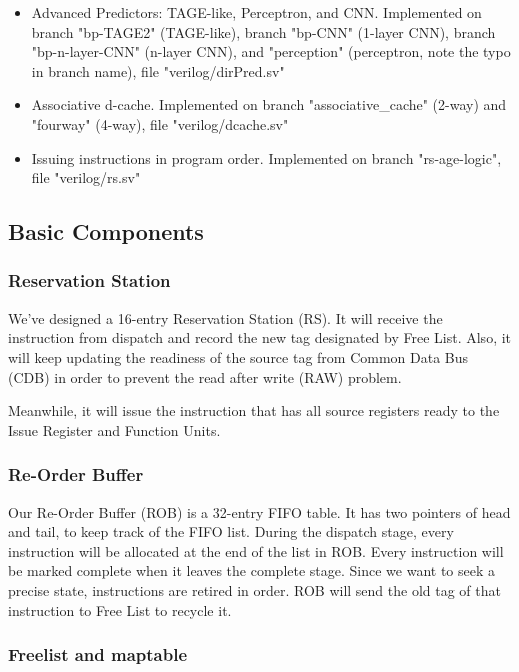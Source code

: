 \begin{itemize}
  \item Advanced Predictors: TAGE-like, Perceptron, and CNN. Implemented on branch "bp-TAGE2" (TAGE-like), branch "bp-CNN" (1-layer CNN), branch "bp-n-layer-CNN" (n-layer CNN), and "perception" (perceptron, note the typo in branch name), file "verilog/dirPred.sv"
  \item Associative d-cache. Implemented on branch "associative\_cache" (2-way) and "fourway" (4-way), file "verilog/dcache.sv"
  \item Issuing instructions in program order. Implemented on branch "rs-age-logic", file "verilog/rs.sv"
\end{itemize}

\subsection{Basic Components}
\subsubsection{Reservation Station}

We've designed a 16-entry Reservation Station (RS). It will receive the instruction from dispatch and record the new tag designated by Free List. Also, it will keep updating the readiness of the source tag from Common Data Bus (CDB) in order to prevent the read after write (RAW) problem. 

Meanwhile, it will issue the instruction that has all source registers ready to the Issue Register and Function Units. 

\subsubsection{Re-Order Buffer}

Our Re-Order Buffer (ROB) is a 32-entry FIFO table. It has two pointers of head and tail, to keep track of the FIFO list. During the dispatch stage, every instruction will be allocated at the end of the list in ROB. Every instruction will be marked complete when it leaves the complete stage. Since we want to seek a precise state, instructions are retired in order. ROB will send the old tag of that instruction to Free List to recycle it. 

\subsubsection{Freelist and maptable}

